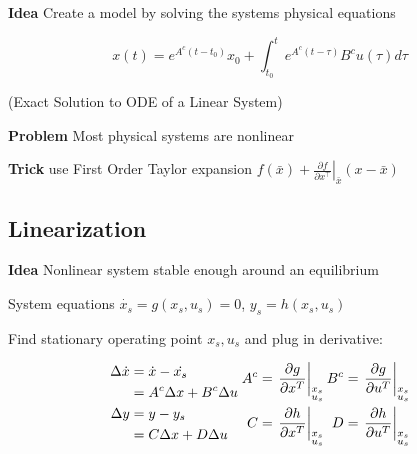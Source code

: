 


\textbf{Idea}
Create a model by solving the systems physical equations

\[
	x(t) = e^{A^c(t-t_0)}x_0 +
	\textstyle\int_{t_0}^{t}e^{A^c(t-\tau)}B^c u(\tau)d\tau
\]
\centerline{\scriptsize
	(Exact Solution to ODE of a Linear System)}

\textbf{Problem}
Most physical systems are nonlinear

\textbf{Trick}
use First Order Taylor expansion
$f(\bar{x}) + \left. \frac{\partial f}{\partial x^\top} \right
	\rvert_{\bar{x}} (x-\bar{x})$

\subsection{Linearization}
\textbf{Idea}
Nonlinear system  stable enough around an equilibrium

System equations
$\dot{x_s} = g(x_s,u_s)=0$, $y_s = h(x_s,u_s)$

Find stationary operating point $x_s,u_s$ and plug in derivative:

\begin{align*}
	\begin{aligned}
		\Delta \dot{x} & =\dot{x} -\dot{x_s}         \\
		               & = A^c\Delta x + B^c\Delta u \\
		\Delta y       & = y - y_s                   \\
		               & = C\Delta x + D\Delta u
	\end{aligned}
	\hspace{1mm}
	\begin{aligned}
		A^c             & =  \left.\frac{\partial g}{\partial x^T}\right| _{\substack{x_s                                                                    \\u_s}}
		\hspace{-1.4mm} & \hspace{-1.4mm}B^c                                              & =   \left.\frac{\partial g}{\partial u^T}\right| _{\substack{x_s \\u_s}}
		\\
		C               & =  \left.\frac{\partial h}{\partial x^T}\right| _{\substack{x_s                                                                    \\u_s}}
		\hspace{-1.4mm} & \hspace{-1.4mm}D                                                & =   \left.\frac{\partial h}{\partial u^T}\right| _{\substack{x_s \\u_s}}
	\end{aligned}
\end{align*}

